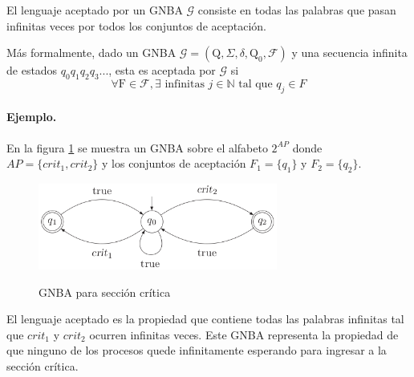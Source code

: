 El lenguaje aceptado por un GNBA $\mathcal{G}$ consiste en todas las palabras que pasan infinitas
 veces por todos los conjuntos de aceptación.

Más formalmente, dado un GNBA $\mathcal{G} = (\text{Q}, \Sigma, \delta, \text{Q}_0, \mathcal{F})$ y
 una secuencia infinita de estados $q_0 q_1 q_2 q_3 ...$, esta es aceptada por $\mathcal{G}$ si
\[ \forall \text{F} \in \mathcal{F}, \exists \text{ infinitas } j \in \mathbb{N} \text{ tal que } q_j \in F \]

 
\paragraph{Ejemplo.}
En la figura \ref{fig:seccion_critica} se muestra un GNBA sobre el alfabeto $2^{AP}$
 donde $AP = \{ crit_1, crit_2 \}$ y los conjuntos de aceptación
 $F_1 = \{ q_1 \}$ y $F_2 = \{ q_2 \}$.

\begin{figure}[hbtp]
\begin{center}
\caption{GNBA para sección crítica}
\includegraphics[width=0.7\textwidth]{buchi/imagenes/ejemplo4_53.png}
\label{fig:seccion_critica}
\end{center}
\end{figure}

El lenguaje aceptado es la propiedad que contiene todas las palabras infinitas tal que $crit_1$ y 
$crit_2$ ocurren infinitas veces.
Este GNBA representa la propiedad de que ninguno de los procesos quede infinitamente
 esperando para ingresar a la sección crítica.
